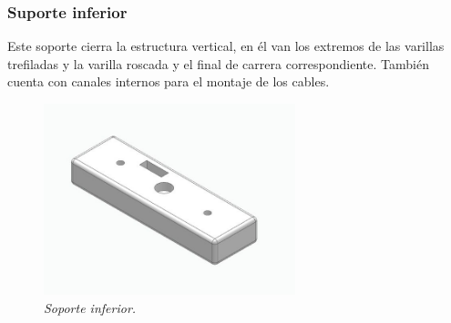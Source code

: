 \subsubsection{Suporte inferior}
Este soporte cierra la estructura vertical, en él van los extremos de las varillas trefiladas y la varilla roscada y el final de carrera correspondiente. También cuenta con canales internos para el montaje de los cables. \\
\begin{figure}[H]
    \centering
\includegraphics[width=0.65\textwidth]{img/InferiorReal_simplificado_vista.jpg} \par
    \caption{\textit{Soporte inferior.}}
    \label{fig:soporte_inferior_real}
\end{figure}

